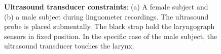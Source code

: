 \begin{figure}
	\centering
		\hspace{0.05\textwidth}

	\caption[Ultrasound transducer constraints]{\textbf{Ultrasound transducer constraints}:
	(a) A female subject and (b) a male subject during linguometer recordings.
	The ultrasound probe is placed submentally. The black strap hold the
	laryngograph sensors in fixed position.
	In the specific case of the male subject, the ultrasound transducer touches
	the larynx.}
	\label{fig:linguometer:us:constraints}
\end{figure}
